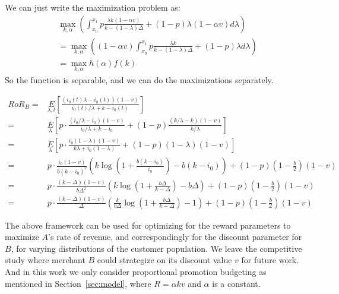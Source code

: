 {\nolan

We can just write the maximization problem as:
\begin{align*}
&\max_{k,\alpha} \left(\int_{x_0}^{x_1} p \frac{\lambda k (1-\alpha v)}{k-(1-\lambda) \Delta} + (1-p)\lambda (1-\alpha v) d\lambda \right) \\
&= \max_{k,\alpha} \left((1-\alpha v) \int_{x_0}^{x_1} p \frac{\lambda k}{k-(1-\lambda) \Delta} + (1-p)\lambda d\lambda \right) \\
&= \max_{k,\alpha} h(\alpha)f(k)
\end{align*}
So the function is separable, and we can do the maximizations separately.
}

\begin{align*}
RoR_B =& \underset{\lambda, t}E\left[\frac{(i_0(t)\lambda - i_0(t))(1-v)}{i_0(t)/\lambda + k - i_0(t)}\right]\\
                                     =& \underset{\lambda}E\left[p\cdot\frac{(i_0/\lambda - i_0)(1-v)}{i_0/\lambda + k - i_0} + (1-p)\frac{(k/\lambda - k)(1-v)}{k/\lambda}\right]\\
                                     =& \underset{\lambda}E\left[p\cdot\frac{i_0(1-\lambda)(1-v)}{k\lambda + i_0(1-\lambda)} + (1-p)(1-\lambda)(1-v)\right]\\
                                     =& p\cdot\frac{i_0(1-v)}{b(k-i_0)^2}\left(k\log\left(1+\frac{b(k-i_0)}{i_0}\right) - b(k-i_0)\right) + (1-p)(1-\frac{b}{2})(1-v)\\
                                     =& p\cdot\frac{(k-\Delta)(1-v)}{b\Delta^2}\left(k\log\left(1+\frac{b\Delta}{k-\Delta}\right) - b\Delta\right) + (1-p)(1-\frac{b}{2})(1-v)\\
                                     =& p\cdot\frac{(k-\Delta)(1-v)}{\Delta}\left(\frac{k}{b\Delta}\log\left(1+\frac{b\Delta}{k-\Delta}\right) - 1\right) + (1-p)(1-\frac{b}{2})(1-v)\label{eq:rorB_eval}
\end{align*}

The above framework can be used for optimizing for the reward parameters to maximize $A$'s rate of revenue, and correspondingly for the discount parameter for $B$, for varying distributions of the customer population.
We leave the competitive study where merchant $B$ could strategize on its discount value $v$ for future work.
And in this work we only consider proportional promotion budgeting as mentioned in Section~\ref{sec:model}, where $R = \alpha k v$ and $\alpha$ is a constant.


